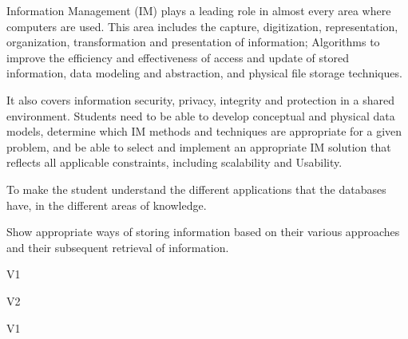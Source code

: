 \begin{syllabus}


\begin{justification}
Information Management (IM) plays a leading role in almost every area where computers are used. This area includes the capture, digitization, representation, organization, transformation and presentation of information; Algorithms to improve the efficiency and effectiveness of access and update of stored information, data modeling and abstraction, and physical file storage techniques.

It also covers information security, privacy, integrity and protection in a shared environment. Students need to be able to develop conceptual and physical data models, determine which IM methods and techniques are appropriate for a given problem, and be able to select and implement an appropriate IM solution that reflects all applicable constraints, including scalability and Usability.
\end{justification}

\begin{goals}
\item To make the student understand the different applications that the databases have, in the different areas of knowledge.
\item Show appropriate ways of storing information based on their various approaches and their subsequent retrieval of information.
\end{goals}

\begin{outcomes}{V1}
    \item {}
    \item {}
    \item {}
\end{outcomes}

\begin{outcomes}{V2}
    \item {}
    \item {}
\end{outcomes}

\begin{competences}{V1}
    \item {} 
    \item {}
    \item {}
\end{competences}


\end{syllabus}
